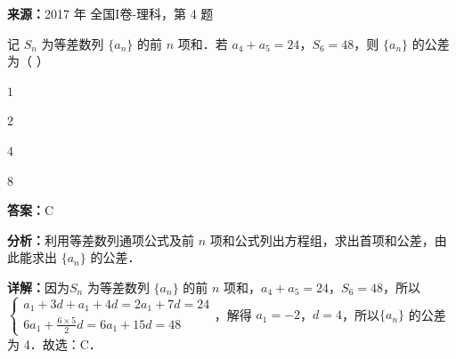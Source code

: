 \begin{question}[points=5]
\textbf{来源：}2017 年 全国I卷-理科，第 4 题\par
记 $S_n$ 为等差数列 $\{a_n\}$ 的前 $n$ 项和．若 $a_4+a_5=24$，$S_6=48$，则 $\{a_n\}$ 的公差为（ ）
\begin{choices}
  \item $1$
  \item $2$
  \item $4$
  \item $8$
\end{choices}
\begin{solution}
\textbf{答案：}C

\textbf{分析：}利用等差数列通项公式及前 $n$ 项和公式列出方程组，求出首项和公差，由此能求出 $\{a_n\}$ 的公差．

\textbf{详解：}因为$S_n$ 为等差数列 $\{a_n\}$ 的前 $n$ 项和，$a_4+a_5=24$，$S_6=48$，所以$\begin{cases} a_1+3d+a_1+4d=2a_1+7d=24 \\ 6a_1+\frac{6\times5}{2}d=6a_1+15d=48 \end{cases}$，解得 $a_1=-2$，$d=4$，所以$\{a_n\}$ 的公差为 4．故选：C．
\end{solution}
\end{question}

